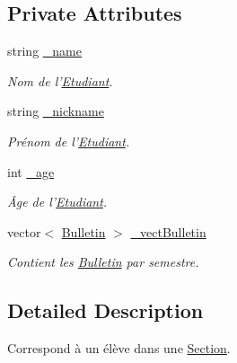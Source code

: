 \subsection*{Private Attributes}
\begin{DoxyCompactItemize}
\item 
\hypertarget{class_etudiant_abba3c8563cdb233d88ee64fe5c669b91}{string \hyperlink{class_etudiant_abba3c8563cdb233d88ee64fe5c669b91}{\-\_\-name}}\label{class_etudiant_abba3c8563cdb233d88ee64fe5c669b91}

\begin{DoxyCompactList}\small\item\em Nom de l'\hyperlink{class_etudiant}{Etudiant}. \end{DoxyCompactList}\item 
\hypertarget{class_etudiant_add9b98a047ad6970abe4f0a52e683228}{string \hyperlink{class_etudiant_add9b98a047ad6970abe4f0a52e683228}{\-\_\-nickname}}\label{class_etudiant_add9b98a047ad6970abe4f0a52e683228}

\begin{DoxyCompactList}\small\item\em Prénom de l'\hyperlink{class_etudiant}{Etudiant}. \end{DoxyCompactList}\item 
\hypertarget{class_etudiant_a0ef171fa224f5aaad46e5ae04e81f512}{int \hyperlink{class_etudiant_a0ef171fa224f5aaad46e5ae04e81f512}{\-\_\-age}}\label{class_etudiant_a0ef171fa224f5aaad46e5ae04e81f512}

\begin{DoxyCompactList}\small\item\em Âge de l'\hyperlink{class_etudiant}{Etudiant}. \end{DoxyCompactList}\item 
vector$<$ \hyperlink{class_bulletin}{Bulletin} $>$ \hyperlink{class_etudiant_a7a5650c79bad376ef70930e59dfa3994}{\-\_\-vect\-Bulletin}
\begin{DoxyCompactList}\small\item\em Contient les \hyperlink{class_bulletin}{Bulletin} par semestre. \end{DoxyCompactList}\end{DoxyCompactItemize}


\subsection{Detailed Description}
Correspond à un élève dans une \hyperlink{class_section}{Section}. 

